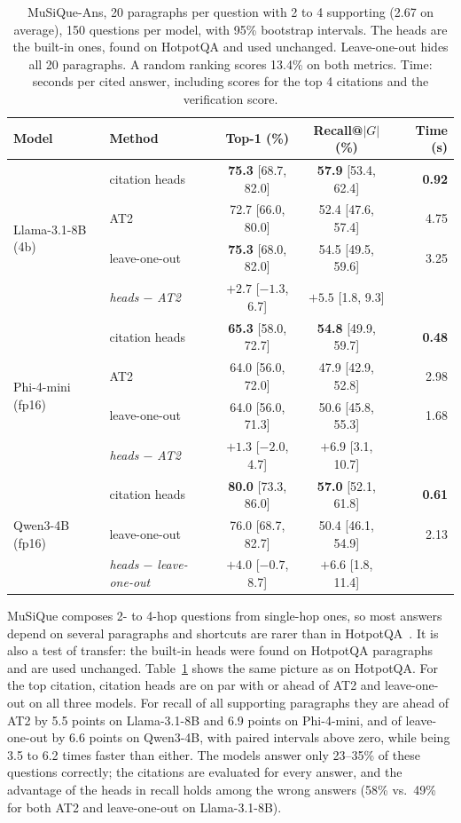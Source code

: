\documentclass[11pt]{article}
\newcommand{\best}[1]{\textbf{#1}}
\begin{document}
\begin{table}[t]
\centering
\small
\caption{MuSiQue-Ans, 20 paragraphs per question with 2 to 4 supporting (2.67 on average), 150 questions per model, with 95\% bootstrap intervals. The heads are the built-in ones, found on HotpotQA and used unchanged. Leave-one-out hides all 20 paragraphs. A random ranking scores 13.4\% on both metrics. Time: seconds per cited answer, including scores for the top 4 citations and the verification score.}
\label{tab:musique}
\begin{tabular}{llccr}
\toprule
Model & Method & Top-1 (\%) & Recall@$|G|$ (\%) & Time (s) \\
\midrule
\multirow{4}{*}{Llama-3.1-8B (4b)} & citation heads & \best{75.3} [68.7, 82.0] & \best{57.9} [53.4, 62.4] & \best{0.92} \\
& AT2 & 72.7 [66.0, 80.0] & 52.4 [47.6, 57.4] & 4.75 \\
& leave-one-out & \best{75.3} [68.0, 82.0] & 54.5 [49.5, 59.6] & 3.25 \\
& \emph{heads $-$ AT2} & $+2.7$ [$-1.3$, 6.7] & $+5.5$ [1.8, 9.3] & \\
\midrule
\multirow{4}{*}{Phi-4-mini (fp16)} & citation heads & \best{65.3} [58.0, 72.7] & \best{54.8} [49.9, 59.7] & \best{0.48} \\
& AT2 & 64.0 [56.0, 72.0] & 47.9 [42.9, 52.8] & 2.98 \\
& leave-one-out & 64.0 [56.0, 71.3] & 50.6 [45.8, 55.3] & 1.68 \\
& \emph{heads $-$ AT2} & $+1.3$ [$-2.0$, 4.7] & $+6.9$ [3.1, 10.7] & \\
\midrule
\multirow{3}{*}{Qwen3-4B (fp16)} & citation heads & \best{80.0} [73.3, 86.0] & \best{57.0} [52.1, 61.8] & \best{0.61} \\
& leave-one-out & 76.0 [68.7, 82.7] & 50.4 [46.1, 54.9] & 2.13 \\
& \emph{heads $-$ leave-one-out} & $+4.0$ [$-0.7$, 8.7] & $+6.6$ [1.8, 11.4] & \\
\bottomrule
\end{tabular}
\end{table}

MuSiQue composes 2- to 4-hop questions from single-hop ones, so most answers depend on several paragraphs and shortcuts are rarer than in HotpotQA~\citep{trivedi2022musique}. It is also a test of transfer: the built-in heads were found on HotpotQA paragraphs and are used unchanged. Table~\ref{tab:musique} shows the same picture as on HotpotQA. For the top citation, citation heads are on par with or ahead of AT2 and leave-one-out on all three models. For recall of all supporting paragraphs they are ahead of AT2 by 5.5 points on Llama-3.1-8B and 6.9 points on Phi-4-mini, and of leave-one-out by 6.6 points on Qwen3-4B, with paired intervals above zero, while being 3.5 to 6.2 times faster than either. The models answer only 23--35\% of these questions correctly; the citations are evaluated for every answer, and the advantage of the heads in recall holds among the wrong answers (58\% vs.\ 49\% for both AT2 and leave-one-out on Llama-3.1-8B).
\end{document}
